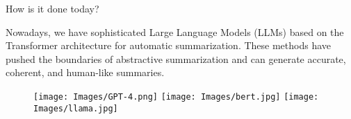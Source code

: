 \begin{frame}{How is it done today?}

	Nowadays, we have sophisticated Large Language Models (LLMs) based on the
	Transformer architecture \citep{vaswani2017attention} for automatic summarization.
	These methods have pushed the boundaries of abstractive summarization and can
	generate accurate, coherent, and human-like summaries.

	\vskip 1.3cm

	\begin{figure}
		\centering
		\texttt{[image: Images/GPT-4.png]}
		\hfill
		\texttt{[image: Images/bert.jpg]}
		\hfill
		\texttt{[image: Images/llama.jpg]}
	\end{figure}

\end{frame}
